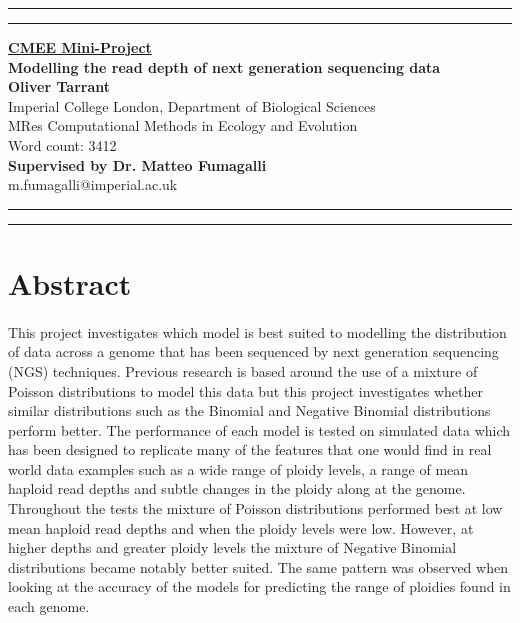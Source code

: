 \documentclass[11pt]{article}
\newcommand{\soptitle}{Modelling the read depth of next generation sequencing data}
\begin{document}
\begin{titlepage}
\begin{center}
\hrule
\vspace{2pt}
\hrule
\vspace{2cm}
\LARGE {\bf \underline{CMEE Mini-Project}}\\
\vspace{2cm}
\huge{\bf \soptitle}\\
\vspace{4cm}
\LARGE {\bf Oliver Tarrant}\\
\large{Imperial College London, Department of Biological Sciences}\\
\large{MRes Computational Methods in Ecology and Evolution}\\
\vfill
\large{Word count: 3412}\\
\huge {\bf Supervised by Dr. Matteo Fumagalli}\\
\large {m.fumagalli@imperial.ac.uk} 
\end{center}
\hrule
\vspace{2pt}
\hrule
\end{titlepage}
\linenumbers
\section{Abstract}
\paragraph{}This project investigates which model is best suited to modelling the distribution of data across a genome that has been sequenced by next generation sequencing (NGS) techniques. Previous research is based around the use of a mixture of Poisson distributions to model this data but this project investigates whether similar distributions such as the Binomial and Negative Binomial distributions perform better. The performance of each model is tested on simulated data which has been designed to replicate many of the features that one would find in real world data examples such as a wide range of ploidy levels, a range of mean haploid read depths and subtle changes in the ploidy along at the genome. Throughout the tests the mixture of Poisson distributions performed best at low mean  haploid read depths and when the ploidy levels were low. However, at higher depths and greater ploidy levels the mixture of Negative Binomial distributions became notably better suited. The same pattern was observed when looking at the accuracy of the models for predicting the range of ploidies found in each genome.  
\end{document}
